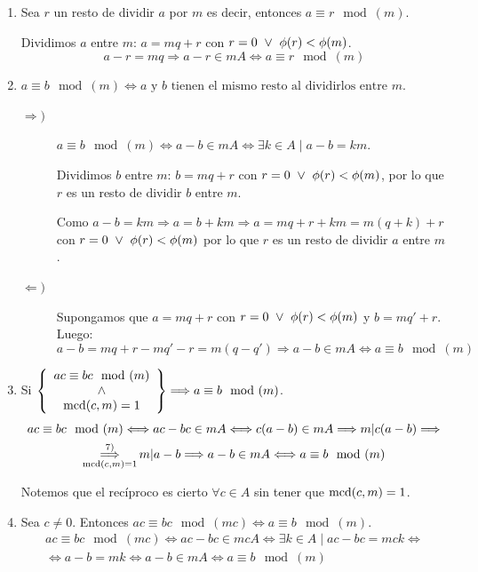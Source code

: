 \begin{enumerate}
    \item Sea $r$ un resto de dividir $a$ por $m$ es decir, entonces $a\equiv r\mod (m)$.

    Dividimos $a$ entre $m$: $a=mq+r$ con $r= 0 \ \lor \  \phi(r) < \phi(m)$.
    $$a-r = mq \Longrightarrow a-r \in mA \Longleftrightarrow a\equiv r\mod(m)$$

    \item $a\equiv b\mod(m) \Longleftrightarrow a \text{ y } b \text{ tienen el mismo resto al dividirlos entre } m.$
    \begin{description}
        \item[$\Longrightarrow)$] $a\equiv b\mod(m) \Longleftrightarrow a-b \in mA \Longleftrightarrow \exists k \in A \mid a-b =km$.
        
            Dividimos $b$ entre $m$: $b = mq + r$ con $r=0 \ \lor \  \phi(r) < \phi(m)$, por lo que $r$ es un resto de dividir $b$ entre $m$.
            
            Como $a-b=km \Longrightarrow a=b+km \Longrightarrow a=mq+r+km = m(q+k)+r$ con $r=0 \ \lor \  \phi(r)<\phi(m)$ por lo que $r$ es un resto de dividir $a$ entre $m$.
            
        \item[$\Longleftarrow)$]
            Supongamos que $a=mq+r$ con $r=0 \ \lor \  \phi(r)<\phi(m)$ y $b=mq' +r$. Luego:
            $$a-b = mq +r -mq'-r = m(q-q') \Longrightarrow a-b \in mA \Longleftrightarrow a\equiv b\mod(m)$$
    \end{description}

    \item \label{conj_prop7}Si $\left\{ \begin{array}{c}
        ac \equiv bc\mod(m) \\ \ \land \  \\
        \operatorname{mcd}(c,m)=1
    \end{array} \right\} \Longrightarrow a\equiv b\mod(m)$.
    \begin{multline*}
        ac \equiv bc\mod(m) \Longleftrightarrow ac - bc \in mA \Longleftrightarrow c(a-b) \in mA \Longrightarrow m|c(a-b) \Longrightarrow \\
        \mathop{\Longrightarrow}^{7)}_{\operatorname{mcd}(c,m)=1} m|a-b \Longrightarrow a-b \in mA \Longleftrightarrow a\equiv b\mod(m)
    \end{multline*}

    Notemos que el recíproco es cierto $\forall c \in A$ sin tener que $\operatorname{mcd}(c,m)=1$.

    \item \label{conj_prop8} Sea $c\neq 0$. Entonces $ac\equiv bc\mod(mc) \Longleftrightarrow a\equiv b\mod(m)$.
    \begin{multline*}
        ac\equiv bc\mod(mc) \Longleftrightarrow ac-bc \in mcA \Longleftrightarrow \exists k \in A \mid ac-bc = mck \Longleftrightarrow \\
        \Longleftrightarrow a-b = mk \Longleftrightarrow a-b \in mA \Longleftrightarrow a\equiv b\mod(m)
    \end{multline*}
\end{enumerate}

